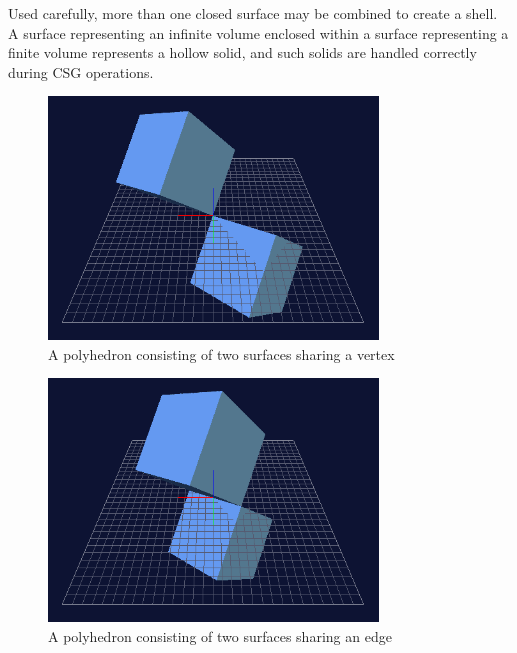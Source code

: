 \documentclass{carve}
\begin{document}
Used carefully, more than one closed surface may be combined to create
a shell. A surface representing an infinite volume enclosed within a
surface representing a finite volume represents a hollow solid, and
such solids are handled correctly during CSG operations.

\begin{figure}
  \begin{center}\includegraphics[width=3.453in]{polyhedra/shared-vertex.png}\end{center}
  \caption{A polyhedron consisting of two surfaces sharing a vertex}
  \label{fig:polyhedron-shared-vertex}
\end{figure}

\begin{figure}
  \begin{center}\includegraphics[width=3.453in]{polyhedra/shared-edge.png}\end{center}
  \caption{A polyhedron consisting of two surfaces sharing an edge}
  \label{fig:polyhedron-shared-edge}
\end{figure}
\end{document}
